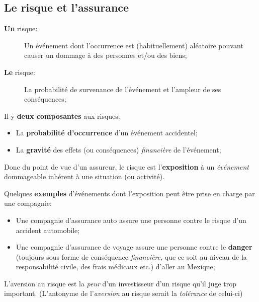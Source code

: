 \documentclass[10pt, french]{article}
\begin{document}
\raggedcolumns
\begin{multicols*}{3} 
\section{Le risque et l'assurance}
\begin{definitionNOHFILL}[Risque]
\begin{description}
	\item[\textbf{Un} risque:] Un événement dont l'occurrence est (habituellement) aléatoire pouvant causer un dommage à des personnes et/ou des biens;
	\item[\textbf{Le} risque:] La probabilité de survenance de l'événement et l'ampleur de ses conséquences;
\end{description}

Il y \textbf{deux composantes} aux risques:
\begin{itemize}
	\item	La \textbf{probabilité d'occurrence} d'un événement accidentel;
	\item	La \textbf{gravité} des effets (ou conséquences) \textit{financière} de l'événement;
\end{itemize}

Donc du point de vue d'un assureur, le risque est l'\textbf{exposition} à un \textit{événement} dommageable inhérent à une situation (ou activité). 

Quelques \textbf{exemples} d'événements dont l'exposition peut être prise en charge par une compagnie:
\begin{itemize}
	\item	Une compagnie d'assurance auto assure une personne contre le risque d'un accident automobile;
	\item	Une compagnie d'assurance de voyage assure une personne contre le \textbf{danger} (toujours sous forme de conséquence \textit{financière}, que ce soit au niveau de la responsabilité civile, des frais médicaux etc.) d'aller au Mexique;
\end{itemize}
\end{definitionNOHFILL}

\begin{definitionNOHFILL}[Aversion]
L'aversion au risque est la \textit{peur} d'un investisseur d'un risque qu'il juge trop important.
(L'antonyme de l'\textit{aversion} au risque serait la \textit{tolérance} de celui-ci)


\end{definitionNOHFILL}
\end{multicols*}
\end{document}
